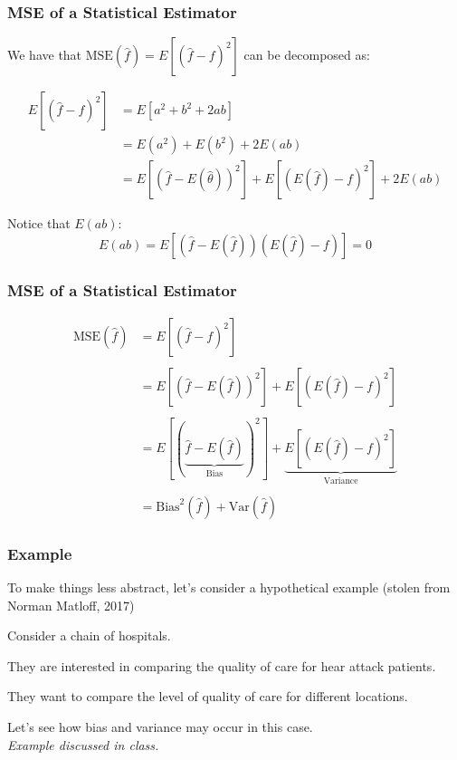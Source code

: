 \documentclass[12pt]{beamer}\usepackage[]{graphicx}\usepackage[]{color}
\begin{document}
\begin{frame}
\frametitle{MSE of a Statistical Estimator}

We have that $\text{MSE}(\hat{f}) = E[(\hat{f} - f)^2]$ can be decomposed as:

\begin{align*}
E \left [ (\hat{f} - f)^2 \right ] &= E[a^2 + b^2 + 2ab] \\
&= E(a^2) + E(b^2) + 2E(ab) \\
&= E [ (\hat{f} - E(\hat{\theta}))^2 ] +
E [ (E(\hat{f}) - f)^2 ] + 2E(ab)
\end{align*}

Notice that $E(ab)$:
$$
E(ab) = E[ (\hat{f} - E(\hat{f})) (E(\hat{f}) - f) ] = 0
$$

\end{frame}


\begin{frame}
\frametitle{MSE of a Statistical Estimator}

\begin{align*}
\text{MSE}(\hat{f}) &= E \left [ (\hat{f} - f)^2 \right ] \\
& \\
&= E [ (\hat{f} - E(\hat{f}))^2 ] +
E [ (E(\hat{f}) - f)^2 ] \\
& \\
&= E [(\underbrace{\hat{f} - E(\hat{f})}_{\text{Bias}})^2] + 
\underbrace{E [ (E(\hat{f}) - f)^2 ]}_{\text{Variance}} \\
& \\
&= \text{Bias}^{2} (\hat{f}) + \text{Var}(\hat{f})
\end{align*}

\end{frame}


\begin{frame}
\frametitle{Example}

To make things less abstract, let's consider a hypothetical example
{\lolit (stolen from Norman Matloff, 2017)}

\bbi
  \item Consider a chain of hospitals.
  \item They are interested in comparing the quality of care for hear attack patients.
  \item They want to compare the level of quality of care for different locations.
  \item Let's see how bias and variance may occur in this case. \\
  {\lolit \textit{Example discussed in class.}}
\ei

\end{frame}
\end{document}
